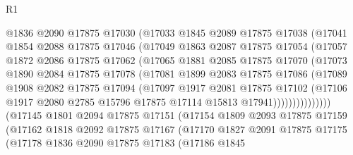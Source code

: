 \begin{lexlean}{R1}
\begin{coremodule}
                  @1836
                  @2090
                  @17875
                  @17030
                  (@17033
                    @1845
                    @2089
                    @17875
                    @17038
                    (@17041
                      @1854
                      @2088
                      @17875
                      @17046
                      (@17049
                        @1863
                        @2087
                        @17875
                        @17054
                        (@17057
                          @1872
                          @2086
                          @17875
                          @17062
                          (@17065
                            @1881
                            @2085
                            @17875
                            @17070
                            (@17073
                              @1890
                              @2084
                              @17875
                              @17078
                              (@17081
                                @1899
                                @2083
                                @17875
                                @17086
                                (@17089
                                  @1908
                                  @2082
                                  @17875
                                  @17094
                                  (@17097
                                    @1917
                                    @2081
                                    @17875
                                    @17102
                                    (@17106
                                      @1917
                                      @2080
                                      @2785
                                      @15796
                                      @17875
                                      @17114
                                      @15813
                                      @17941)))))))))))))))
        (@17145
          @1801
          @2094
          @17875
          @17151
          (@17154
            @1809
            @2093
            @17875
            @17159
            (@17162
              @1818
              @2092
              @17875
              @17167
              (@17170
                @1827
                @2091
                @17875
                @17175
                (@17178
                  @1836
                  @2090
                  @17875
                  @17183
                  (@17186
                    @1845

\end{coremodule}
\end{lexlean}
